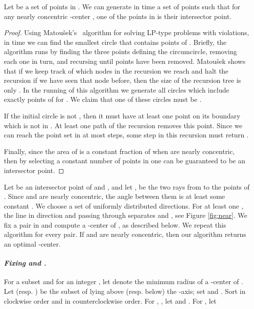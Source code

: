 \documentclass[11pt]{myclass}
\begin{document}
\begin{lemma}
Let  be a set of  points in .  We can generate in  time a set  of  points such that for any nearly concentric -center , one of the points in  is their intersector point.  
\end{lemma}

\begin{proof}
Using Matou\v{s}ek's~\cite{Mat95} algorithm for solving LP-type problems with violations, in  time we can find the smallest circle that contains  points of .  
Briefly, the algorithm runs by finding the three points defining the circumcircle, removing each one in turn, and recursing until  points have been removed.  Matou\v{s}ek shows that if we keep track of which nodes in the recursion we reach and halt the recursion if we have seen that node before, then the size of the recursion tree is only .  
In the running of this algorithm we generate all circles which include exactly  points of  for .  We claim that one of these circles must be . 

If the initial circle is not , then it must have at least one point on its 
boundary which is not in .  At least one path of the recursion removes this point.  Since we can reach the point set  in at most  steps, some step in this recursion must return .  


Finally, since the area of  is a constant fraction of  when  are nearly concentric, then by selecting a constant number of points in  one can be guaranteed to be an intersector point. 
\end{proof}




Let  be an intersector point of  and , and let ,  be the two rays from   to the points of .  
Since  and  are nearly concentric, the angle between them is at least some constant .  We choose a set  of  uniformly distributed directions.  For at least one , the line  in direction  and passing through  separates  and , see Figure \ref{fig:near}.  We fix a pair  in  and compute a -center of , as described below.  We repeat this algorithm for every pair.  If  and  are nearly concentric, then our algorithm returns an optimal -center.  

\paragraph{\textbf{\emph{Fixing  and .}}}
For a subset  and for an integer , let  denote the minimum radius of a -center of .  Let  (resp. ) be the subset of  lying above (resp. below) the -axis; set  and .  Sort  in clockwise order and  in counterclockwise order.  
For , , let  and .  
For , let 
\end{document}
